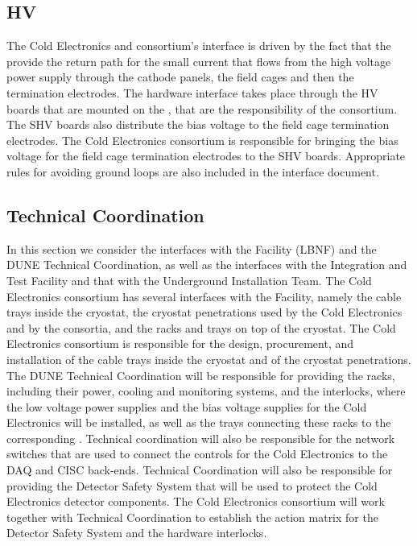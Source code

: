 \subsection{HV}
\label{sec:fdsp-tpcelec-interfaces-hv}

The Cold Electronics and  consortium's interface
is driven by the fact that the provide the return path for
the small current that flows from the high voltage power 
supply through the cathode panels, the field cages and then
the termination electrodes. The hardware interface takes place through
the HV boards that are mounted on the , that
are  the responsibility of the  consortium. The
SHV boards also distribute the bias voltage to the field
cage termination electrodes. The Cold  Electronics consortium
is responsible for bringing the bias voltage for the field
cage termination electrodes to the SHV boards. Appropriate
rules for avoiding ground loops are also included in the 
interface document.

\subsection{Technical Coordination}
\label{sec:fdsp-tpcelec-interfaces-tc}

In this section we consider the interfaces with the Facility (LBNF)
and the DUNE Technical Coordination, as well as the interfaces with
the Integration and Test Facility and that with the Underground
Installation Team. The Cold Electronics consortium has several
interfaces with the Facility, namely the cable trays inside the
cryostat, the cryostat penetrations used by the Cold Electronics
and by the  consortia, and the racks and trays on top
of the cryostat. The Cold Electronics consortium is responsible
for the design, procurement, and installation of the cable trays
inside the cryostat and of the cryostat penetrations. The DUNE
Technical Coordination will be responsible for providing the racks,
including their power, cooling and monitoring systems, and the interlocks,
where the low voltage power supplies and the bias voltage supplies
for the Cold  Electronics will be installed, as well as the trays
connecting these racks to the corresponding . Technical
coordination will also be responsible for the network switches that
are used to connect the controls for the Cold Electronics to the
DAQ and CISC back-ends. Technical Coordination will also be responsible
for providing the Detector Safety System that will be used to protect
the Cold Electronics detector components. The Cold  Electronics
consortium will work together with Technical Coordination to establish
the action matrix for the Detector Safety System and the hardware
interlocks.


